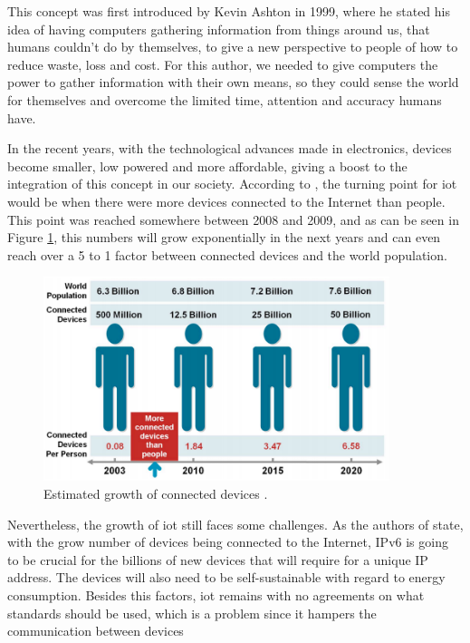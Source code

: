 This concept was first introduced by Kevin Ashton \cite{Ashton} in 1999, where he stated his idea of having computers gathering information from things around us, that humans couldn't do by themselves, to give a new perspective to people of how to reduce waste, loss and cost. For this author, we needed to give computers the power to gather information with their own means, so they could sense the world for themselves and overcome the limited time, attention and accuracy humans have.

In the recent years, with the technological advances made in electronics, devices become smaller, low powered and more affordable, giving a boost to the integration of this concept in our society. According to \cite{Evans2011}, the turning point for \ac{iot} would be when there were more devices connected to the Internet than people. This point was reached somewhere between 2008 and 2009, and as can be seen in Figure \ref{fig:iot_pic}, this numbers will grow exponentially in the next years and can even reach over a 5 to 1 factor between connected devices and the world population.

\begin{figure}[H]
	\centering
	\includegraphics[width=0.9\textwidth]{figures/iot_pic.png}
	\caption{Estimated growth of connected devices \cite{Evans2011}. }
	\label{fig:iot_pic}
\end{figure}

Nevertheless, the growth of \ac{iot} still faces some challenges. As the authors of \cite{Al-fuqaha2015} state, with the grow number of devices being connected to the Internet, IPv6 is going to be crucial for the billions of new devices that will require for a unique IP address. The devices will also need to be self-sustainable with regard to energy consumption. Besides this factors, \ac{iot} remains with no agreements on what standards should be used, which is a problem since it hampers the communication between devices


